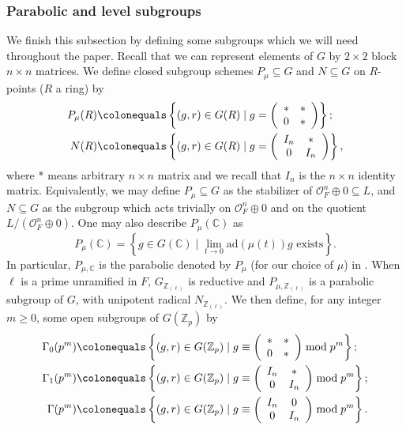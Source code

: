 \documentclass{amsart}
\theoremstyle{remark}
\numberwithin{equation}{subsection}
\def\C{\CC}
\newcommand{\Z}{\ZZ}
\newcommand{\CC}{{\mathbb C}}
\newcommand{\ZZ}{{\mathbb Z}}
\newcommand{\cO}{{\mathcal O}}
\newcommand{\Zp}{\Z_p}
\newcommand{\ad}{\mathrm{ad}}
\newcommand{\sub}{\subseteq}
\newcommand{\defeq}{\colonequals}
\renewcommand{\(}{\left(}
\renewcommand{\)}{\right)}
\begin{document}
\subsubsection{Parabolic and level subgroups}\label{levels} We finish this subsection by defining some subgroups which we will need throughout the paper.
Recall that we can represent elements of $G$ by $2\times 2$ block $n\times n$ matrices. We define closed subgroup schemes $P_\mu \sub G$ and $N \sub G$ on $R$-points ($R$ a ring) by  
\begin{align*}
  P_\mu(R) & \defeq \left\{(g,r)\in G(R) \mid g = \left(\begin{array}{cc} * & *\\ 0 & * \end{array}\right) \right\}; \\
  N(R) & \defeq \left\{(g,r)\in G(R) \mid g = \left(\begin{array}{cc} I_n  & * \\ 0 & I_n \end{array}\right) \right\},
\end{align*}
where $*$ means arbitrary $n\times n$ matrix and we recall that $I_n$ is the $n\times n$ identity matrix. Equivalently, we may define $P_\mu \sub G$ as the stabilizer of $\cO_F^n \oplus 0 \sub L$, and $N \sub G$ as the subgroup which acts trivially on $\cO_F^n \oplus 0 $ and on the quotient $L/(\cO_F^n \oplus 0)$. One may also describe $P_\mu(\C)$ as 
\[
P_\mu(\C) = \left\{ g\in G(\C) \mid \lim_{t\to 0} \ad(\mu(t))g \text{ exists}\right\}.
\]
In particular, $P_{\mu,\C}$ is the parabolic denoted by $P_\mu$ (for our choice of $\mu$) in \cite[\S 2.1]{caraiani-scholze}. When $\ell$ is a prime unramified in $F$, $G_{\Z_{(\ell)}}$ is reductive and $P_{\mu,\Z_{(\ell)}}$ is a parabolic subgroup of $G$, with unipotent radical $N_{\Z_{(\ell)}}$. We then define, for any integer $m\geq 0$, some open subgroups of $G(\Zp)$ by
\begin{align*}
  \Gamma_0(p^m) & \defeq \left\{(g,r)\in G(\Zp) \mid g \equiv \left(\begin{array}{cc} * & *\\ 0 & * \end{array}\right) \bmod p^m \right\}; \\
  \Gamma_1(p^m) &\defeq \left\{(g,r)\in G(\Zp) \mid g \equiv  \left(\begin{array}{cc} I_n  & * \\ 0 & I_n \end{array}\right) \bmod p^m\right\}; \\
  \Gamma(p^m) & \defeq \left\{(g,r) \in G(\Zp) \mid g \equiv \left(\begin{array}{cc} I_n & 0 \\ 0 & I_n \end{array}\right) \bmod p^m \right\}.
\end{align*}
\end{document}
